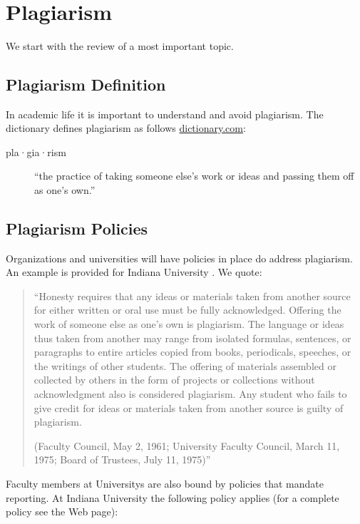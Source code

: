 \FILENAME\

\section{Plagiarism}\label{S:plagiarism}

We start with the review of a most important topic.

\subsection{Plagiarism Definition}

In academic life it is important to understand and avoid plagiarism.
The dictionary defines plagiarism as follows \url{dictionary.com}:


\begin{description}
\item[pla·gia·rism] ``the practice of taking someone else's work or ideas and passing them
off as one's own.''
\end{description}



\subsection{Plagiarism Policies}
Organizations and universities will have policies in place do address
plagiarism. An example is provided for Indiana University
\cite{www-iu-plagiarism}. We quote:

\begin{quotation}
``Honesty requires that any ideas or materials taken from
another source for either written or oral use must be fully
acknowledged. Offering the work of someone else as one’s own is
plagiarism. The language or ideas thus taken from another may range
from isolated formulas, sentences, or paragraphs to entire articles
copied from books, periodicals, speeches, or the writings of other
students. The offering of materials assembled or collected by others
in the form of projects or collections without acknowledgment also is
considered plagiarism. Any student who fails to give credit for ideas
or materials taken from another source is guilty of plagiarism. 

(Faculty Council, May 2, 1961; University Faculty Council, March 11,
1975; Board of Trustees, July 11, 1975)''
\end{quotation}

Faculty members at Universitys are also bound by policies that mandate
reporting. At Indiana University the following policy applies (for a
complete policy see the Web page):

